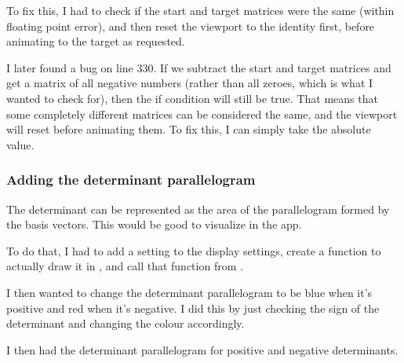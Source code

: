 \documentclass[../development.tex]{subfiles}
\begin{document}
To fix this, I had to check if the start and target matrices were the same (within floating point error), and then reset the viewport to the identity first, before animating to the target as requested.


I later found a bug on line 330. If we subtract the start and target matrices and get a matrix of all negative numbers (rather than all zeroes, which is what I wanted to check for), then the if condition will still be true. That means that some completely different matrices can be considered the same, and the viewport will reset before animating them. To fix this, I can simply take the absolute value.


\subsubsection{Adding the determinant parallelogram\label{development:adding-display-settings:adding-the-determinant-parallelogram}}

The determinant can be represented as the area of the parallelogram formed by the basis vectors. This would be good to visualize in the app.

To do that, I had to add a setting to the display settings, create a function to actually draw it in , and call that function from .




I then wanted to change the determinant parallelogram to be blue when it's positive and red when it's negative. I did this by just checking the sign of the determinant and changing the colour accordingly.


I then had the determinant parallelogram for positive and negative determinants.
\end{document}
